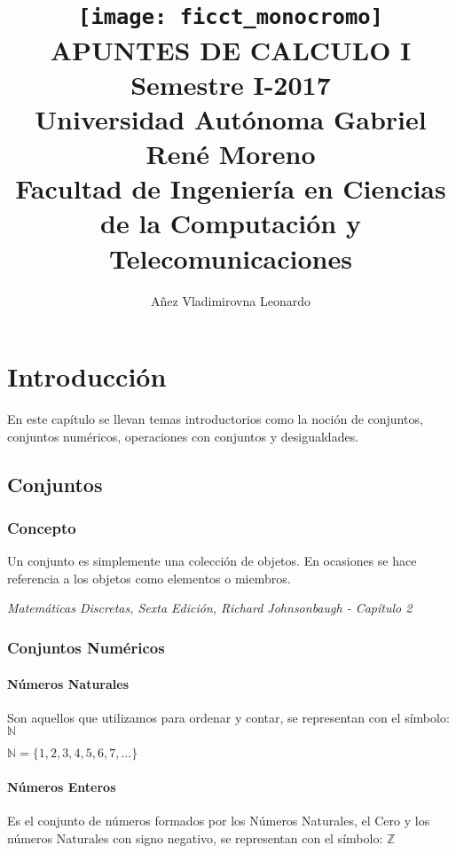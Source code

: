 \documentclass[12pt,a4paper]{book}
\author{Añez Vladimirovna Leonardo}
\title
{
\texttt{[image: ficct\_monocromo]}\\ \vspace{2cm}
{\LARGE \textbf{APUNTES DE CALCULO I}} \\ {\large Semestre I-2017} \\ \vspace{1cm} 
{\large Universidad Autónoma Gabriel René Moreno}\\
{\normalsize Facultad de Ingeniería en Ciencias de la Computación y Telecomunicaciones}
}
\begin{document}
 	
 \maketitle
 
 \tableofcontents
 
\chapter{Introducción}
En este capítulo se llevan temas introductorios como la noción de conjuntos, conjuntos numéricos, operaciones con conjuntos y desigualdades.
\section{Conjuntos}
\subsection{Concepto}

\begin{framed}\noindent
Un conjunto es simplemente una colección de objetos. En ocasiones se hace referencia a los objetos como elementos o miembros.
\begin{flushright}
\textit{{\scriptsize Matemáticas Discretas, Sexta Edición, Richard Johnsonbaugh - Capítulo 2}}
\end{flushright}
\vspace{-0.5cm}
\end{framed}


\subsection{Conjuntos Numéricos}
\subsubsection{Números Naturales}
Son aquellos que utilizamos para ordenar y contar, se representan con el símbolo: $\mathbb{N}$ 

\begin{center}
$\mathbb{N} = \lbrace 1,2,3,4,5,6,7,... \rbrace$
\end{center}

\subsubsection{Números Enteros}
Es el conjunto de números formados por los Números Naturales, el Cero y los números Naturales con signo negativo, se representan con el símbolo: $\mathbb{Z}$
\end{document}

